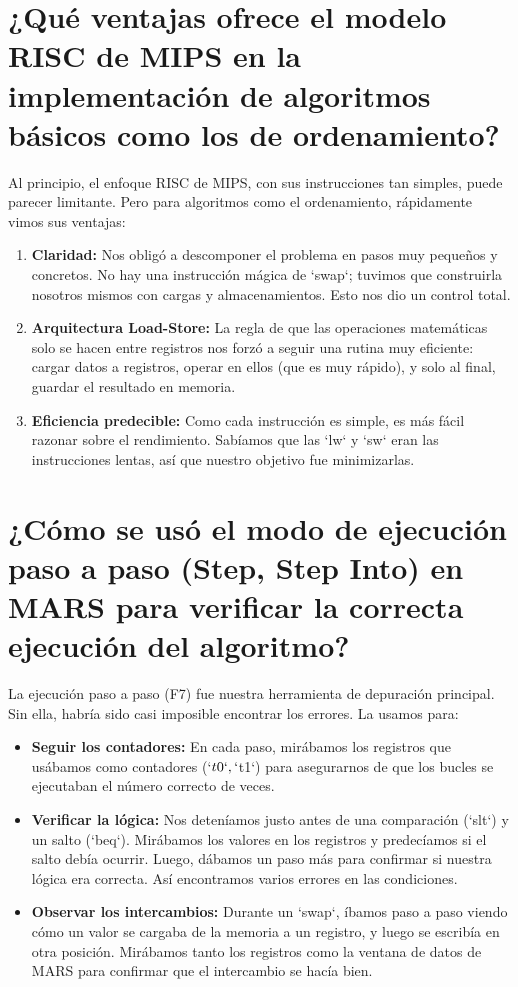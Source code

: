\documentclass{article}
\begin{document}
\section{¿Qué ventajas ofrece el modelo RISC de MIPS en la implementación de algoritmos básicos como los de ordenamiento?}
\indent\indent Al principio, el enfoque RISC de MIPS, con sus instrucciones tan simples, puede parecer limitante. Pero para algoritmos como el ordenamiento, rápidamente vimos sus ventajas:
\begin{enumerate}
    \item \textbf{Claridad:} Nos obligó a descomponer el problema en pasos muy pequeños y concretos. No hay una instrucción mágica de `swap`; tuvimos que construirla nosotros mismos con cargas y almacenamientos. Esto nos dio un control total.
    \item \textbf{Arquitectura Load-Store:} La regla de que las operaciones matemáticas solo se hacen entre registros nos forzó a seguir una rutina muy eficiente: cargar datos a registros, operar en ellos (que es muy rápido), y solo al final, guardar el resultado en memoria.
    \item \textbf{Eficiencia predecible:} Como cada instrucción es simple, es más fácil razonar sobre el rendimiento. Sabíamos que las `lw` y `sw` eran las instrucciones lentas, así que nuestro objetivo fue minimizarlas.
\end{enumerate}

\section{¿Cómo se usó el modo de ejecución paso a paso (Step, Step Into) en MARS para verificar la correcta ejecución del algoritmo?}
\indent\indent La ejecución paso a paso (F7) fue nuestra herramienta de depuración principal. Sin ella, habría sido casi imposible encontrar los errores. La usamos para:
\begin{itemize}
    \item \textbf{Seguir los contadores:} En cada paso, mirábamos los registros que usábamos como contadores (`$t0`, `$t1`) para asegurarnos de que los bucles se ejecutaban el número correcto de veces.
    \item \textbf{Verificar la lógica:} Nos deteníamos justo antes de una comparación (`slt`) y un salto (`beq`). Mirábamos los valores en los registros y predecíamos si el salto debía ocurrir. Luego, dábamos un paso más para confirmar si nuestra lógica era correcta. Así encontramos varios errores en las condiciones.
    \item \textbf{Observar los intercambios:} Durante un `swap`, íbamos paso a paso viendo cómo un valor se cargaba de la memoria a un registro, y luego se escribía en otra posición. Mirábamos tanto los registros como la ventana de datos de MARS para confirmar que el intercambio se hacía bien.
\end{itemize}
\end{document}
